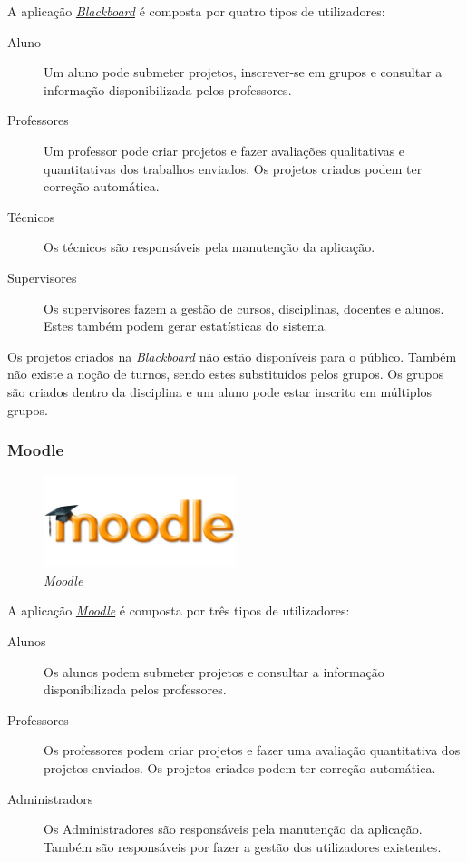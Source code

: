 A aplicação \href{http://www.blackboard.com}{\emph{Blackboard}} é composta por quatro tipos de utilizadores:
\begin{description}
	\item[Aluno] Um aluno pode submeter projetos, inscrever-se em grupos e consultar a informação disponibilizada pelos professores.
	\item[Professores] Um professor pode criar projetos e fazer avaliações qualitativas e quantitativas dos trabalhos enviados. Os projetos criados podem ter correção automática.
	\item[Técnicos] Os técnicos são responsáveis pela manutenção da aplicação.
	\item[Supervisores] Os supervisores fazem a gestão de cursos, disciplinas, docentes e alunos. Estes também podem gerar estatísticas do sistema.
\end{description}

Os projetos criados na \emph{Blackboard} não estão disponíveis para o público. Também não existe a noção de turnos, sendo estes substituídos pelos grupos. Os grupos são criados dentro da disciplina e um aluno pode estar inscrito em múltiplos grupos.

\subsubsection{Moodle}
\label{ssub:moodle}
\begin{figure}[H]
        \centering
        \includegraphics[width=0.5\textwidth]{images/concorrencia/moodle.jpg}
         \caption{\emph{Moodle}}
         \label{fig: moodle}
\end{figure}
A aplicação \href{http://www.moodle.org}{\emph{Moodle}} é composta por três tipos de utilizadores:

\begin{description}
	\item[Alunos] Os alunos podem submeter projetos e consultar a informação disponibilizada pelos professores.
	\item[Professores] Os professores podem criar projetos e fazer uma avaliação quantitativa dos projetos enviados. Os projetos criados podem ter correção automática.
	\item[Administradors] Os Administradores são responsáveis pela manutenção da aplicação. Também são responsáveis por fazer a gestão dos utilizadores existentes.
\end{description}


